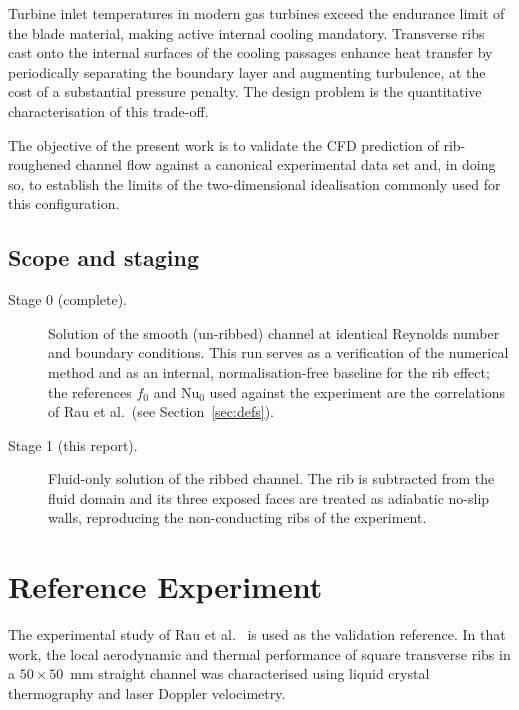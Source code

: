\documentclass[11pt,a4paper]{article}
\newcommand{\Nuss}{\mathrm{Nu}}
\begin{document}
Turbine inlet temperatures in modern gas turbines exceed the endurance
limit of the blade material, making active internal cooling mandatory.
Transverse ribs cast onto the internal surfaces of the cooling passages
enhance heat transfer by periodically separating the boundary layer and
augmenting turbulence, at the cost of a substantial pressure penalty. The
design problem is the quantitative characterisation of this trade-off.

The objective of the present work is to validate the CFD prediction of
rib-roughened channel flow against a canonical experimental data set and, in
doing so, to establish the limits of the two-dimensional idealisation
commonly used for this configuration.

\subsection{Scope and staging}

\begin{description}
  \item[Stage 0 (complete).] Solution of the smooth (un-ribbed) channel at
  identical Reynolds number and boundary conditions. This run serves as a
  verification of the numerical method and as an internal, normalisation-free
  baseline for the rib effect; the references $f_{0}$ and $\Nuss_{0}$ used
  against the experiment are the correlations of Rau et al.\ (see
  Section~\ref{sec:defs}).

  \item[Stage 1 (this report).] Fluid-only solution of the ribbed channel.
  The rib is subtracted from the fluid domain and its three exposed faces
  are treated as adiabatic no-slip walls, reproducing the non-conducting
  ribs of the experiment.
\end{description}

\section{Reference Experiment}

The experimental study of Rau et al.~\cite{rau1996} is used as the
validation reference. In that work, the local aerodynamic and thermal
performance of square transverse ribs in a $50 \times 50$~mm straight
channel was characterised using liquid crystal thermography and laser
Doppler velocimetry.
\end{document}
